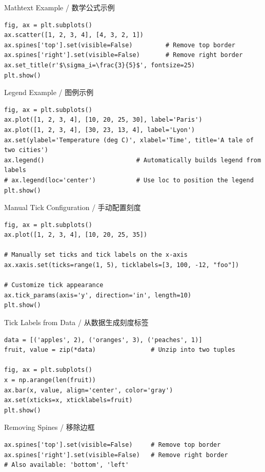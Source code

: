 \documentclass[11pt,a4paper]{report}
\begin{document}
\begin{examplebox}{Mathtext Example / 数学公式示例}
\begin{lstlisting}
fig, ax = plt.subplots()
ax.scatter([1, 2, 3, 4], [4, 3, 2, 1])
ax.spines['top'].set(visible=False)         # Remove top border
ax.spines['right'].set(visible=False)       # Remove right border
ax.set_title(r'$\sigma_i=\frac{3}{5}$', fontsize=25)
plt.show()
\end{lstlisting}
\end{examplebox}

\begin{examplebox}{Legend Example / 图例示例}
\begin{lstlisting}
fig, ax = plt.subplots()
ax.plot([1, 2, 3, 4], [10, 20, 25, 30], label='Paris')
ax.plot([1, 2, 3, 4], [30, 23, 13, 4], label='Lyon')
ax.set(ylabel='Temperature (deg C)', xlabel='Time', title='A tale of two cities')
ax.legend()                         # Automatically builds legend from labels
# ax.legend(loc='center')           # Use loc to position the legend
plt.show()
\end{lstlisting}
\end{examplebox}

\begin{examplebox}{Manual Tick Configuration / 手动配置刻度}
\begin{lstlisting}
fig, ax = plt.subplots()
ax.plot([1, 2, 3, 4], [10, 20, 25, 35])

# Manually set ticks and tick labels on the x-axis
ax.xaxis.set(ticks=range(1, 5), ticklabels=[3, 100, -12, "foo"])

# Customize tick appearance
ax.tick_params(axis='y', direction='in', length=10)
plt.show()
\end{lstlisting}
\end{examplebox}

\begin{examplebox}{Tick Labels from Data / 从数据生成刻度标签}
\begin{lstlisting}
data = [('apples', 2), ('oranges', 3), ('peaches', 1)]
fruit, value = zip(*data)               # Unzip into two tuples

fig, ax = plt.subplots()
x = np.arange(len(fruit))
ax.bar(x, value, align='center', color='gray')
ax.set(xticks=x, xticklabels=fruit)
plt.show()
\end{lstlisting}
\end{examplebox}

\begin{examplebox}{Removing Spines / 移除边框}
\begin{lstlisting}
ax.spines['top'].set(visible=False)     # Remove top border
ax.spines['right'].set(visible=False)   # Remove right border
# Also available: 'bottom', 'left'
\end{lstlisting}
\end{examplebox}
\end{document}
